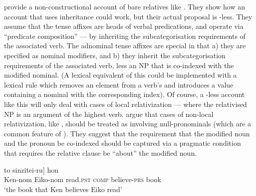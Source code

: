 \documentclass[output=paper
 	        ,biblatex
                ,babelshorthands
                ,newtxmath
                ,draftmode
                ,colorlinks, citecolor=brown
]{langscibook}
\begin{document}
\cite{SiraiGunjiRelative} provide a non-constructional account of  bare relatives
like . They show how an account that uses  inheritance could
work, but their actual proposal is -less. They assume that the tense affixes
are heads of verbal predications, and operate via ``predicate composition'' --- by
inheriting the subcategorisation requirements of the associated verb. The adnominal tense
affixes are special in that a) they are specified as nominal modifiers, and b) they
inherit the subcategorisation requirements of the associated verb, less an NP that is
co-indexed with the modified nominal. (A lexical equivalent of this could be implemented with a lexical rule which removes an
element from a verb's  and introduces a  value containing a
nominal with the corresponding index). 
Of course, a -less account like this
will only deal with cases of local relativization --- where the relativised NP is an
argument of the highest verb. \citeauthor{SiraiGunjiRelative} argue that cases of
non-local relativization, like , should be treated as involving
null-pronominals (which are a common feature of ). They suggest that the requirement
that the modified noun and the pronoun be co-indexed should be captured via a pragmatic
condition that requires the relative clause be ``about'' the modified noun.
 \begin{exe}\ex\label{x:rc-85}
   \gll [Ken-ga                                  [Eiko-ga     \trace\subscr{i} yon-da] to sinzitei-ru] hon\\
        \hphantom{[}Ken-{\sc nom} \hphantom{[}Eiko-{\sc nom} {}        read.\textsc{pst} \textsc{comp}
          believe-\textsc{prs} book\\
 \glt `the book that Ken believes Eiko read'
 \end{exe}

\end{document}
